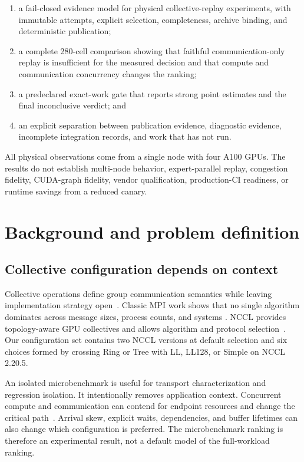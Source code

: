 \documentclass[10pt,twocolumn]{article}
\begin{document}
\begin{enumerate}
  \item a fail-closed evidence model for physical collective-replay experiments,
    with immutable attempts, explicit selection, completeness, archive binding,
    and deterministic publication;
  \item a complete 280-cell comparison showing that faithful communication-only
    replay is insufficient for the measured decision and that compute and
    communication concurrency changes the ranking;
  \item a predeclared exact-work gate that reports strong point estimates and the
    final inconclusive verdict; and
  \item an explicit separation between publication evidence, diagnostic
    evidence, incomplete integration records, and work that has not run.
\end{enumerate}

All physical observations come from a single node with four A100 GPUs. The
results do not establish multi-node behavior, expert-parallel replay,
congestion fidelity, CUDA-graph fidelity, vendor qualification, production-CI
readiness, or runtime savings from a reduced canary.

\section{Background and problem definition}

\subsection{Collective configuration depends on context}

Collective operations define group communication semantics while leaving
implementation strategy open~\cite{mpi}. Classic MPI work shows that no single
algorithm dominates across message sizes, process counts, and systems
\cite{thakur,vadhiyar}. NCCL provides topology-aware GPU collectives and allows
algorithm and protocol selection~\cite{nccl}. Our configuration set contains
two NCCL versions at default selection and six choices formed by crossing Ring
or Tree with LL, LL128, or Simple on NCCL 2.20.5.

An isolated microbenchmark is useful for transport characterization and
regression isolation. It intentionally removes application context. Concurrent
compute and communication can contend for endpoint resources and change the
critical path~\cite{overlap}. Arrival skew, explicit waits, dependencies, and
buffer lifetimes can also change which configuration is preferred. The
microbenchmark ranking is therefore an experimental result, not a default
model of the full-workload ranking.
\end{document}
